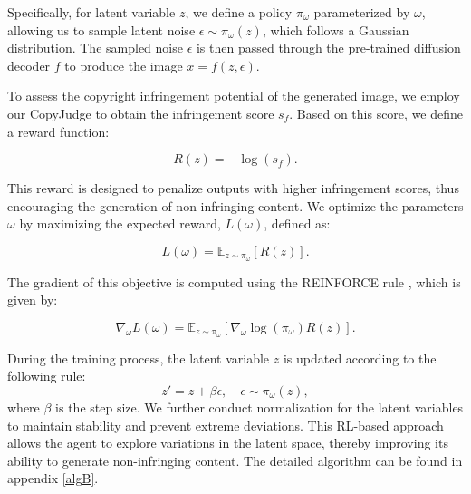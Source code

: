 Specifically, for latent variable \( z \), we define a policy \( \pi_{\omega} \) parameterized by \( \omega \), allowing us to sample latent noise \( \epsilon \sim \pi_{\omega}(z) \), which follows a Gaussian distribution. The sampled noise \( \epsilon \) is then passed through the pre-trained diffusion decoder \( f \) to produce the image \( x = f(z, \epsilon) \).

To assess the copyright infringement potential of the generated image, we employ our CopyJudge to obtain the infringement score $s_{f}$. Based on this score, we define a reward function:

\begin{equation}
    R(z) = -\log(s_{f}).
\end{equation}

This reward is designed to penalize outputs with higher infringement scores, thus encouraging the generation of non-infringing content. We optimize the parameters \( \omega \) by maximizing the expected reward, \( L(\omega) \), defined as:

\begin{equation}
    L(\omega) = \mathbb{E}_{z \sim \pi_{\omega}}[R(z)].
\end{equation}

The gradient of this objective is computed using the REINFORCE rule \cite{williams1992simple}, which is given by:

\begin{equation}
\nabla_{\omega}L(\omega) = \mathbb{E}_{z \sim \pi_{\omega}}[\nabla_{\omega}\log(\pi_{\omega}) R(z)].
\end{equation}

During the training process, the latent variable $z$ is updated according to the following rule:
\begin{equation}
 z' = z + \beta \epsilon, \quad \epsilon \sim \pi_{\omega}(z),
\end{equation}
where $\beta$ is the step size. We further conduct normalization for the latent variables to maintain stability and prevent extreme deviations. This  RL-based approach allows the agent to explore variations in the latent space, thereby improving its ability to generate non-infringing content. The detailed algorithm can be found in appendix \ref{algB}.
